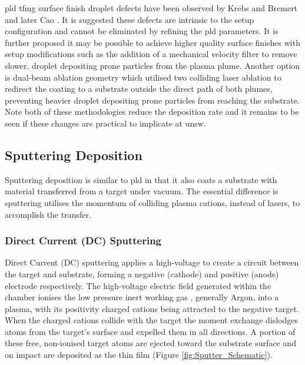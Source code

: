 \documentclass[a4paper,12pt,oneside]{report}%
\begin{document}
\Gls{pld} \gls{tfmg} surface finish droplet defects have been observed by Krebs and Bremert \cite{Krebs1993} and later Cao \cite{Cao2013}. It is suggested these defects are intrinsic to the setup configuration and cannot be eliminated by refining the \gls{pld} parameters. It is further proposed it may be possible to achieve higher quality surface finishes with setup modifications such as the addition of a mechanical velocity filter to remove slower, droplet depositing prone particles from the plasma plume. Another option is dual-beam ablation geometry which utilised two colliding laser ablation to redirect the coating to a substrate outside the direct path of both plumes, preventing heavier droplet depositing prone particles from reaching the substrate. Note both of these methodologies reduce the deposition rate and it remains to be seen if these changes are practical to implicate at \acrshort{unsw}.

\subsection{Sputtering Deposition}
Sputtering deposition is similar to \gls{pld} in that it also coats a substrate with material transferred from a target under vacuum. The essential difference is sputtering utilises the momentum of colliding plasma cations, instead of lasers, to accomplish the transfer. 

\subsubsection{Direct Current (DC) Sputtering} 
Direct Current (DC) sputtering applies a high-voltage to create a circuit between the target and substrate, forming a negative (cathode) and positive (anode) electrode respectively. The high-voltage electric field generated within the chamber ionises the low pressure inert working gas , generally Argon, into a plasma, with its positivity charged cations being attracted to the negative target. When the charged cations collide with the target the moment exchange dislodges atoms from the target's surface and expelled them in all directions. A portion of these free, non-ionised target atoms are ejected toward the substrate surface and on impact are deposited as the thin film (Figure \ref{fig:Sputter_Schematic}). 
\end{document}
